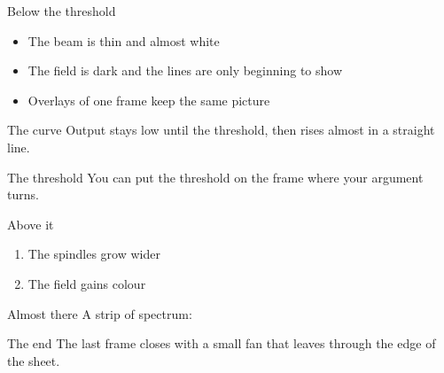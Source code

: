 \documentclass[aspectratio=169]{beamer}
\begin{document}
\begin{frame}[plain]
\end{frame}
\begin{frame}{Below the threshold}
  \begin{itemize}
    \item<1-> The beam is thin and almost white
    \item<2-> The field is dark and the lines are only beginning to show
    \item<3-> Overlays of one frame keep the same picture
  \end{itemize}
\end{frame}
\begin{frame}{The curve}
  Output stays low until the threshold, then rises almost in a straight line.
\end{frame}
\begin{frame}{The threshold}
  \limenthreshold
  You can put the threshold on the frame where your argument turns.
\end{frame}
\begin{frame}{Above it}
  \begin{enumerate}
    \item The spindles grow wider
    \item The field gains colour
  \end{enumerate}
\end{frame}
\begin{frame}{Almost there}
  A strip of spectrum: \limenspectrum[4cm]
\end{frame}
\begin{frame}{The end}
  The last frame closes with a small fan that leaves through the edge of the sheet.
\end{frame}
\end{document}
